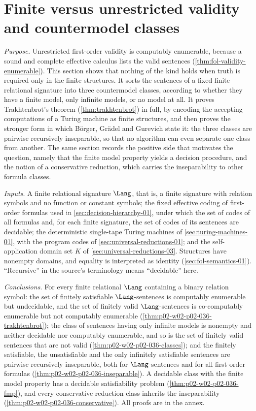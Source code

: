 \section{Finite versus unrestricted validity and countermodel classes}
\label{sec:p02-w02-p02-036-finite-validity}

\emph{Purpose.}  Unrestricted first-order validity is computably enumerable,
because a sound and complete effective calculus lists the valid sentences
(\cref{thm:fol-validity-enumerable}).  This section shows that nothing of the
kind holds when truth is required only in the finite structures.  It sorts
the sentences of a fixed finite relational signature into three
countermodel classes, according to whether they have a finite model, only
infinite models, or no model at all.  It proves Trakhtenbrot's theorem
(\cref{thm:trakhtenbrot}) in full, by encoding the accepting computations of
a Turing machine as finite structures, and then proves the stronger form in
which Börger, Grädel and Gurevich state it: the three classes are pairwise
recursively inseparable, so that no algorithm can even separate one class from
another.  The same section records the positive side that motivates the
question, namely that the finite model property yields a decision procedure,
and the notion of a conservative reduction, which carries the inseparability
to other formula classes.

\emph{Inputs.}  A finite relational signature \(\Lang\), that is, a finite
signature with relation symbols and no function or constant symbols;
the fixed effective coding of first-order formulas used in
\cref{sec:decision-hierarchy-01}, under which the set of codes of all
formulas and, for each finite signature, the set of codes of its sentences
are decidable; the deterministic single-tape Turing machines of
\cref{sec:turing-machines-01}, with the program codes of
\cref{sec:universal-reductions-01}; and the self-application domain set
\(K\) of \cref{sec:universal-reductions-03}.  Structures have nonempty
domains, and equality is interpreted as identity
(\cref{sec:fol-semantics-01}).  ``Recursive'' in the source's terminology
means ``decidable'' here.

\emph{Conclusions.}  For every finite relational \(\Lang\) containing a binary
relation symbol: the set of finitely satisfiable \(\Lang\)-sentences is
computably enumerable but undecidable, and the set of finitely valid
\(\Lang\)-sentences is co-computably enumerable but not computably enumerable
(\cref{thm:p02-w02-p02-036-trakhtenbrot}); the class of sentences having only
infinite models is nonempty and neither decidable nor computably enumerable,
and so is the set of finitely valid sentences that are not valid
(\cref{thm:p02-w02-p02-036-classes}); and the finitely satisfiable, the
unsatisfiable and the only infinitely satisfiable sentences are pairwise
recursively inseparable, both for \(\Lang\)-sentences and for all first-order
formulas (\cref{thm:p02-w02-p02-036-inseparable}).  A decidable class with the
finite model property has a decidable satisfiability problem
(\cref{thm:p02-w02-p02-036-fmp}), and every conservative reduction class
inherits the inseparability (\cref{thm:p02-w02-p02-036-conservative}).  All
proofs are in the annex.

